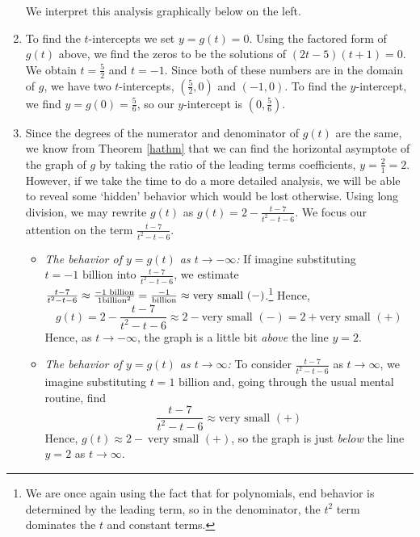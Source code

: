 \documentclass{ximera}
\begin{document}
\begin{example}
\begin{enumerate}
We interpret this analysis graphically below on the left.


\item  To find the $t$-intercepts  we set $y = g(t) = 0$.  Using the factored form of $g(t)$ above, we find the zeros to be the solutions of $(2t-5)(t+1)=0$.  We obtain $t = \frac{5}{2}$ and $t=-1$. Since both of these numbers are in the domain of $g$, we have two $t$-intercepts, $\left( \frac{5}{2},0\right)$ and $(-1,0)$.  To find the $y$-intercept, we find $y = g(0) = \frac{5}{6}$, so our $y$-intercept is $\left(0, \frac{5}{6}\right)$.

\item  Since the degrees of the numerator and denominator of $g(t)$ are the same, we know from Theorem \ref{hathm} that we can find the horizontal asymptote of the graph of $g$ by taking the ratio of the leading terms coefficients, $y = \frac{2}{1} = 2$.  However, if we take the time to do a more detailed analysis, we will be able to reveal some `hidden' behavior which would be lost otherwise.  Using long division, we may rewrite $g(t)$ as $g(t) = 2 - \frac{t-7}{t^2-t-6}.$  We focus our attention on the term $\frac{t-7}{t^2-t-6}$.  

\begin{itemize}

\item  \textit{The behavior of $y=g(t)$ as $t \rightarrow -\infty$:} If imagine substituting $t = \text{$-1$ billion}$ into $\frac{t-7}{t^2-t-6}$, we estimate $\frac{t-7}{t^2-t-6} \approx \frac{\text{\scriptsize $-1$ billion}}{1 \text{\scriptsize billion}^2}  = \frac{-1}{\text{\scriptsize billion}} \approx \text{very small $(-)$}$.\footnote{We are once again using the fact that for polynomials, end behavior is determined by the leading term, so in the denominator, the $t^2$ term dominates the $t$ and constant terms.}  Hence, \[g(t) =  2 - \frac{t-7}{t^2-t-6} \approx 2 - \text{very small $(-)$} = 2 + \text{very small $(+)$}\]  Hence, as $t \rightarrow -\infty$, the graph is a little bit \textit{above} the line $y=2$.

\item  \textit{The behavior of $y=g(t)$ as $t \rightarrow \infty$:}  To consider $\frac{t-7}{t^2-t-6}$ as $t \rightarrow \infty$, we imagine substituting $t= \text{$1$ billion}$ and, going through the usual mental routine, find \[\frac{t-7}{t^2-t-6} \approx \text{very small $(+)$}\]  Hence, $g(t) \approx 2 - \ \text{very small $(+)$}$, so the graph is just \textit{below} the line $y=2$ as $t \rightarrow \infty$.


\end{itemize}
\end{enumerate}
\end{example}
\end{document}
